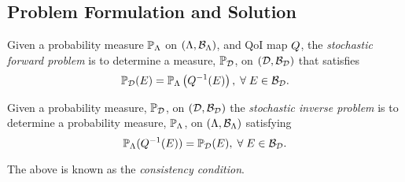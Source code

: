 \subsection{Problem Formulation and Solution}
\begin{frame}[t]

\begin{defn}\label{defn:forward-problem}
  Given a probability measure $\mathbb{P}_{\Lambda}$ on $({\Lambda}, \mathcal{B}_{{\Lambda}})$, and QoI map $Q$, the \emph{stochastic forward problem} is to determine a measure, $\mathbb{P}_{\mathcal{D}}$, on $(\mathcal{D}, \mathcal{B}_{\mathcal{D}})$ that satisfies
  \begin{equation}\label{eq:forward-problem}
    \mathbb{P}_{\mathcal{D}} (E) = \mathbb{P}_{\Lambda} \left ( Q^{-1}(E) \right ), \; \forall \; E \in \mathcal{B}_{\mathcal{D}}.
  \end{equation}
\end{defn}

\end{frame}

\begin{frame}[t]

\begin{defn}\label{defn:inverse-problem}
  Given a probability measure, $\mathbb{P}_{\mathcal{D}}$, on $(\mathcal{D}, \mathcal{B}_{\mathcal{D}})$ the \emph{stochastic inverse problem} is to determine a probability measure, $\mathbb{P}_{\Lambda}$, on $({\Lambda}, \mathcal{B}_{{\Lambda}})$ satisfying
  \begin{equation}\label{eq:inverse-problem}
    \mathbb{P}_{\Lambda} (Q^{-1}(E)) = \mathbb{P}_{\mathcal{D}}(E), \; \forall \; E \in \mathcal{B}_{\mathcal{D}}.
  \end{equation}
\end{defn}

The above is known as the \emph{consistency condition}.
\end{frame}

